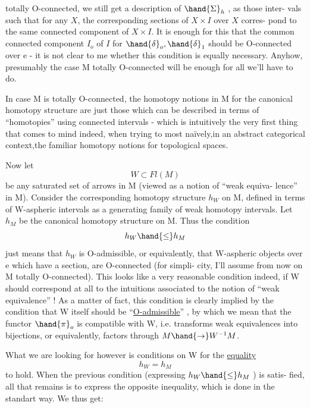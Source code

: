 
totally O-connected,  we still get a description of $\hand{\Sigma}_h$ ,  as those inter-
vals such that for any  $X$, the corresponding sections of $X\times I$ over $X$ corres-
pond to the same connected component of  $X\times I$.  It is enough for this
that the common  connected component $I_o$ of $I$ for $\hand{\delta}_o,\hand{\delta}_1$  should be 
O-connected over e  -  it is  not clear to me whether this condition is
equally necessary.  Anyhow,  presumably the case M totally O-connected will
be enough for all we'll have to do.

In case M is totally O-connected,  the homotopy notions in M for the
canonical homotopy structure are just those which can be described in
terms of ``homotopies'' using connected intervals  -  which is intuitively
the very first thing that comes to mind indeed,  when trying to  
most naïvely,in an abstract categorical context,the familiar homotopy
notions for topological spaces.

Now let
\[ W\subset Fl(M) \]
be any saturated set of arrows in M  (viewed as a notion of ``weak equiva-%
lence'' in M).  Consider the corresponding homotopy structure $h_W$ on M,
defined in terms of W-aspheric  intervals as a generating family of
weak homotopy intervals.  Let $h_M$  be the canonical homotopy structure
on M.  Thus the condition
\[ h_W \hand{\leq} h_M \]
just means that $h_W$ is O-admissible,  or equivalently,  that W-aspheric
objects over e which have a section,  are  O-connected  (for simpli-%
city,  I'll assume from now on M totally O-connected).  This looks like
a very reasonable condition indeed,  if W should correspond at all to the
intuitions associated to the notion of ``weak equivalence'' !  As a matter
of fact,  this condition is clearly implied by the condition that W itself
should be ``\uline{O-admissible}'' ,  by which we mean that the functor $\hand{\pi}_o$ is
compatible with W,  i.e. transforms weak equivalences into bijections,  or
equivalently,  factors through $M\hand{\rightarrow}W^{-1}M$.

What we are looking for however is conditions on W for the \uline{equality}
\[ h_W = h_M \]
to hold.  When the previous condition  (expressing $h_W\hand{\leq}h_M$ )  is satis-%
fied,  all that remains is to express the opposite inequality,  which is
done in the standart way.  We thus get:

